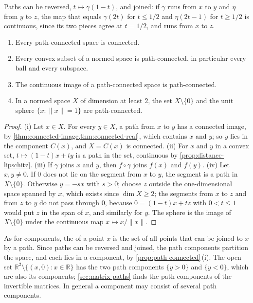 Paths can be reversed, $t\mapsto\gamma(1-t)$, and joined: if $\gamma$ runs from $x$ to $y$ and $\eta$ from $y$ to $z$, the map that equals $\gamma(2t)$ for $t\le1/2$ and $\eta(2t-1)$ for $t\ge1/2$ is continuous, since its two pieces agree at $t=1/2$, and runs from $x$ to $z$.

\begin{proposition}
\label{prop:path-connected}
\leavevmode
\begin{enumerate}
\item Every path-connected space is connected.
\item Every convex subset of a normed space is path-connected, in particular every ball and every subspace.
\item The continuous image of a path-connected space is path-connected.
\item In a normed space $X$ of dimension at least $2$, the set $X\setminus\{0\}$ and the unit sphere $\{x: \|x\|=1\}$ are path-connected.
\end{enumerate}
\end{proposition}

\begin{proof}
(i) Let $x\in X$. For every $y\in X$, a path from $x$ to $y$ has a connected image, by \cref{thm:connected-image,thm:connected-real}, which contains $x$ and $y$; so $y$ lies in the component $C(x)$, and $X=C(x)$ is connected. (ii) For $x$ and $y$ in a convex set, $t\mapsto(1-t)x+ty$ is a path in the set, continuous by \cref{prop:distance-lipschitz}. (iii) If $\gamma$ joins $x$ and $y$, then $f\circ\gamma$ joins $f(x)$ and $f(y)$. (iv) Let $x,y\ne0$. If $0$ does not lie on the segment from $x$ to $y$, the segment is a path in $X\setminus\{0\}$. Otherwise $y=-sx$ with $s>0$; choose $z$ outside the one-dimensional space spanned by $x$, which exists since $\dim X\ge2$; the segments from $x$ to $z$ and from $z$ to $y$ do not pass through $0$, because $0=(1-t)x+tz$ with $0<t\le1$ would put $z$ in the span of $x$, and similarly for $y$. The sphere is the image of $X\setminus\{0\}$ under the continuous map $x\mapsto x/\|x\|$.
\end{proof}

As for components, the  of a point $x$ is the set of all points that can be joined to $x$ by a path. Since paths can be reversed and joined, the path components partition the space, and each lies in a component, by \cref{prop:path-connected}\,(i). The open set $\mathbb R^2\setminus\{(x,0): x\in\mathbb R\}$ has the two path components $\{y>0\}$ and $\{y<0\}$, which are also its components; \cref{sec:matrix-paths} finds the path components of the invertible matrices. In general a component may consist of several path components.

